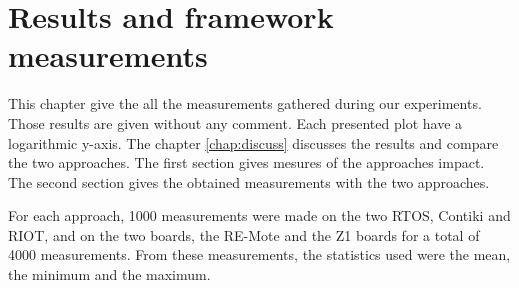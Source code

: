 \chapter{Results and framework measurements \label{chap:results}}

This chapter give the all the measurements gathered during our experiments.
Those results are given without any comment.
Each presented plot have a logarithmic y-axis.
The chapter \ref{chap:discuss} discusses the results and compare the two approaches.
The first section gives mesures of the approaches impact.
The second section gives the obtained measurements with the two approaches.

For each approach, 1000 measurements were made on the two RTOS, Contiki and RIOT, and on the two boards, the RE-Mote and the Z1 boards for a total of 4000 measurements. From these measurements, the statistics used were the mean, the minimum and the maximum.



